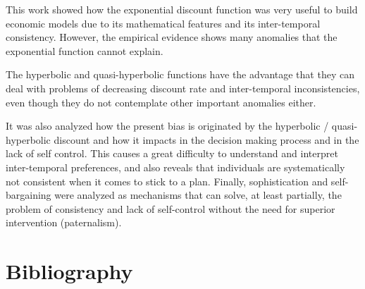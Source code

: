 \documentclass[]{article}
\begin{document}
This work showed how the exponential discount function was very useful to build economic models due to its mathematical features and its inter-temporal consistency. However, the empirical evidence shows many anomalies that the exponential function cannot explain.

The hyperbolic and quasi-hyperbolic functions have the advantage that they can deal with problems of decreasing discount rate and inter-temporal inconsistencies, even though they do not contemplate other important anomalies either.

It was also analyzed how the present bias is originated by the hyperbolic / quasi-hyperbolic discount and how it impacts in the decision making process and in the lack of self control. This causes a great difficulty to understand and interpret inter-temporal preferences, and also reveals that individuals are systematically not consistent when it comes to stick to a plan.
Finally, sophistication and self-bargaining were analyzed as mechanisms that can solve, at least partially, the problem of consistency and lack of self-control without the need for superior intervention (paternalism).

\hypertarget{bibliography}{%
\section{Bibliography}\label{bibliography}}
\end{document}
